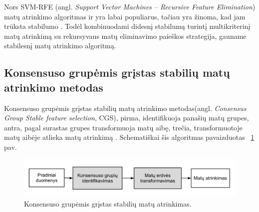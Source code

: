 Nors SVM-RFE (angl. \textit{Support Vector Machines -- Recursive Feature Elimination}) matų atrinkimo algoritmas ir yra labai populiarus, tačiau yra žinoma, kad jam trūksta stabilumo \cite{guyon2002gene}. Todėl kombinuodami didesnį stabilumą turintį multikriterinį matų atrinkimą su rekursyvaus matų eliminavimo paieškos
strategija, gauname stabilesnį matų atrinkimo algoritmą.

\subsection{Konsensuso grupėmis grįstas stabilių matų atrinkimo metodas}

Konsensuso grupėmis grįstas stabilių matų atrinkimo metodas(angl. \textit{Consensus Group Stable feature selection}, CGS), pirma, identifikuoja panašių matų grupes, antra, pagal surastas grupes transformuoja matų aibę, trečia, transformuotoje matų aibėje atlieka matų atrinkimą \cite{loscalzo2009consensus}. Schematiškai šis algoritmas pavaizduotas ~\ref{fig:figure7} pav. 
\begin{figure}
 \centering
 \includegraphics[width=\textwidth]{../bachelor/images/consensus_group_based_feature_selection_framework.pdf}
 \caption{Konsensuso grupėmis grįstas stabilių matų atrinkimas.}
 \label{fig:figure7}
\end{figure}

